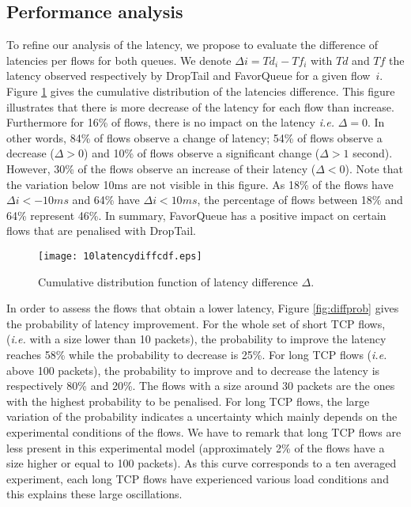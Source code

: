 \documentclass{elsart}
\begin{document}
\subsection{Performance analysis}

To refine our analysis of the latency, we propose to evaluate the difference of latencies per flows for both queues. We denote $\Delta{i} = Td_{i}-Tf_{i}$ with $Td$ and $Tf$ the latency observed respectively by DropTail and FavorQueue for a given flow~$i$. Figure \ref{fig:diffcdf} gives the cumulative distribution of the latencies difference.
This figure illustrates that there is more decrease of the latency for each flow than increase. Furthermore for 16\% of flows, there is no impact on the latency \textit{i.e.} $\Delta = 0$. In other words, 84\% of flows observe 
a change of latency; 54\% of flows observe a decrease ($\Delta > 0$) and 10\% of flows observe a significant change ($\Delta > 1$ second). However, 30\% of the flows observe an increase of their latency ($\Delta < 0$).
Note that the variation below 10ms are not visible in this figure. As 18\% of the flows have $\Delta{i} < -10ms$ and 64\% have $\Delta{i} < 10ms$, the percentage of flows between  18\% and 64\% represent 46\%.
In summary, FavorQueue has a positive impact on certain flows that are penalised with DropTail.


\begin{figure}[ht]
\begin{center}
\texttt{[image: 10latencydiffcdf.eps]}
\end{center}
\caption{Cumulative distribution function of latency difference $\Delta$.}
\label{fig:diffcdf}
\end{figure}

In order to assess the flows that obtain a lower latency, Figure \ref{fig:diffprob} gives the probability of latency improvement. 
For the whole set of short TCP flows, (\textit{i.e.} with a size lower than 10 packets), the probability to improve the latency reaches 58\% while the probability to decrease is 25\%. For long TCP flows (\textit{i.e.} above 100 packets), 
the probability to improve and to decrease the latency is respectively 80\% and 20\%.
The flows with a size around 30 packets are the ones with the highest probability to be penalised. 
For long TCP flows, the large variation of the probability indicates a uncertainty which mainly depends on the experimental conditions of the flows.
We have to remark that long TCP flows are less present in this experimental model (approximately 2\% of the flows have a size higher or equal to 100 packets). As this curve corresponds to a ten averaged experiment, 
each long TCP flows have experienced various load conditions and this explains these large oscillations. 
\end{document}
